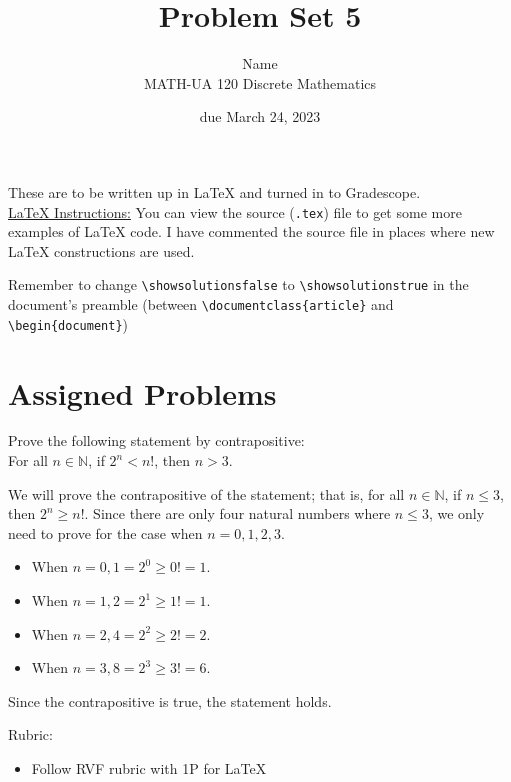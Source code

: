 \documentclass{article}
\title{Problem Set 5}
\author{%
    Name
\\  MATH-UA 120 Discrete Mathematics
}
\date{due March 24, 2023}
\newif\ifshowsolutions
\newcommand{\danger}{\marginpar[\hfill\dbend]{\dbend\hfill}}
\theoremstyle{definition}
\begin{document}
\maketitle



These are to be written up in \LaTeX{} and turned in to Gradescope.\\



\ifshowsolutions
    \SetupExSheets{solution/print=true}
\else
    \danger
 \underline{ \LaTeX{}  Instructions:}  You can view the source (\texttt{.tex}) file to get some more examples of \LaTeX{} code.  I have commented the source file in places where new \LaTeX{} constructions are used.
  
  Remember to change \verb|\showsolutionsfalse| to \verb|\showsolutionstrue|
    in the document's preamble 
    (between \verb|\documentclass{article}| and \verb|\begin{document}|)
\fi

\section*{Assigned Problems}

\begin{question}
    Prove the following statement by contrapositive: \\
    For all $n\in \mathbb{N}$, if $2^n<n!$, then $n>3$.
\end{question}
\begin{solution}
We will prove the contrapositive of the statement; that is, for all $n\in \mathbb{N}$, if $n\leq 3$, then $2^n\geq n!$. Since there are only four natural numbers where $n\leq 3$, we only need to prove for the case when $n=0, 1, 2, 3$.
\begin{itemize}
\item When $n=0, 1 = 2^0 \geq 0!=1.$
\item When $n=1, 2 = 2^1 \geq 1!=1.$
\item When $n=2, 4 = 2^2 \geq 2!=2.$
\item When $n=3, 8 = 2^3 \geq 3!=6.$
\end{itemize}
Since the contrapositive is true, the statement holds.

{\color{red} Rubric:
\begin{itemize}
\item Follow RVF rubric with 1P for \LaTeX
\end{itemize}}
\end{solution}
\end{document}
